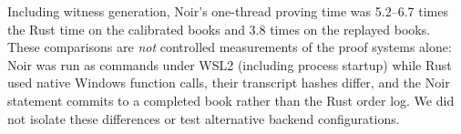 Including witness generation, Noir's one-thread proving time was 5.2--6.7 times the Rust time on the calibrated books and 3.8 times on the replayed books. These comparisons are \emph{not} controlled measurements of the proof systems alone: Noir was run as commands under WSL2 (including process startup) while Rust used native Windows function calls, their transcript hashes differ, and the Noir statement commits to a completed book rather than the Rust order log. We did not isolate these differences or test alternative backend configurations.
